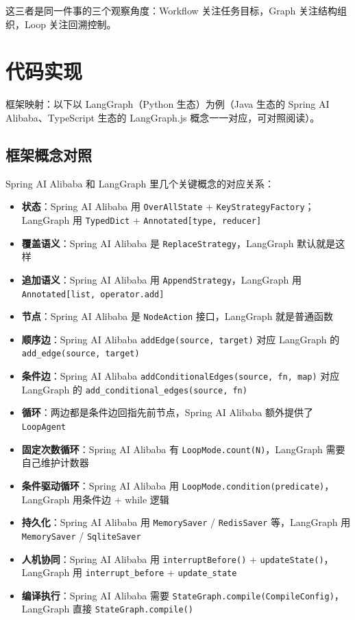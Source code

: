\documentclass[9pt,a4paper,twocolumn]{ctexart}
\begin{document}
这三者是同一件事的三个观察角度：Workflow 关注任务目标，Graph 关注结构组织，Loop 关注回溯控制。



\section*{代码实现}


框架映射：以下以 LangGraph（Python 生态）为例（Java 生态的 Spring AI Alibaba、TypeScript 生态的 LangGraph.js 概念一一对应，可对照阅读）。



\subsection*{框架概念对照}


Spring AI Alibaba 和 LangGraph 里几个关键概念的对应关系：


\begin{itemize}[itemsep=1pt, topsep=2pt]
  \item \textbf{状态}：Spring AI Alibaba 用 \texttt{OverAllState} + \texttt{KeyStrategyFactory}；LangGraph 用 \texttt{TypedDict} + \texttt{Annotated[type, reducer]}
  \item \textbf{覆盖语义}：Spring AI Alibaba 是 \texttt{ReplaceStrategy}，LangGraph 默认就是这样
  \item \textbf{追加语义}：Spring AI Alibaba 用 \texttt{AppendStrategy}，LangGraph 用 \texttt{Annotated[list, operator.add]}
  \item \textbf{节点}：Spring AI Alibaba 是 \texttt{NodeAction} 接口，LangGraph 就是普通函数
  \item \textbf{顺序边}：Spring AI Alibaba \texttt{addEdge(source, target)} 对应 LangGraph 的 \texttt{add\_edge(source, target)}
  \item \textbf{条件边}：Spring AI Alibaba \texttt{addConditionalEdges(source, fn, map)} 对应 LangGraph 的 \texttt{add\_conditional\_edges(source, fn)}
  \item \textbf{循环}：两边都是条件边回指先前节点，Spring AI Alibaba 额外提供了 \texttt{LoopAgent}
  \item \textbf{固定次数循环}：Spring AI Alibaba 有 \texttt{LoopMode.count(N)}，LangGraph 需要自己维护计数器
  \item \textbf{条件驱动循环}：Spring AI Alibaba 用 \texttt{LoopMode.condition(predicate)}，LangGraph 用条件边 + while 逻辑
  \item \textbf{持久化}：Spring AI Alibaba 用 \texttt{MemorySaver} / \texttt{RedisSaver} 等，LangGraph 用 \texttt{MemorySaver} / \texttt{SqliteSaver}
  \item \textbf{人机协同}：Spring AI Alibaba 用 \texttt{interruptBefore()} + \texttt{updateState()}，LangGraph 用 \texttt{interrupt\_before} + \texttt{update\_state}
  \item \textbf{编译执行}：Spring AI Alibaba 需要 \texttt{StateGraph.compile(CompileConfig)}，LangGraph 直接 \texttt{StateGraph.compile()}
\end{itemize}
\end{document}
